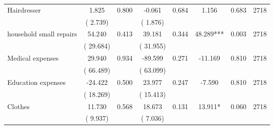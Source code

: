 \begin{tabular}{l*{7}{c}}
 Hairdresser       &              1.825       &        0.800  &             -0.061       &        0.684  &              1.156       &              0.683 &  2718 \\ 
                       &       (       2.739)             &                               &       (       1.876)                     &                               &                                               &                                &                      \\ 

 household small repairs       &             54.240       &        0.413  &             39.181       &        0.344  &             48.289***       &              0.003 &  2718 \\ 
                       &       (      29.684)             &                               &       (      31.955)                     &                               &                                               &                                &                      \\ 

 Medical expenses       &             29.940       &        0.934  &            -89.599       &        0.271  &            -11.169       &              0.810 &  2718 \\ 
                       &       (      66.489)             &                               &       (      63.099)                     &                               &                                               &                                &                      \\ 

 Education expenses       &            -24.422       &        0.500  &             23.977       &        0.247  &             -7.590       &              0.810 &  2718 \\ 
                       &       (      18.269)             &                               &       (      15.413)                     &                               &                                               &                                &                      \\ 

 Clothes       &             11.730       &        0.568  &             18.673       &        0.131  &             13.911*       &              0.060 &  2718 \\ 
                       &       (       9.937)             &                               &       (       7.036)                     &                               &                                               &                                &                      \\ 


\end{tabular}
